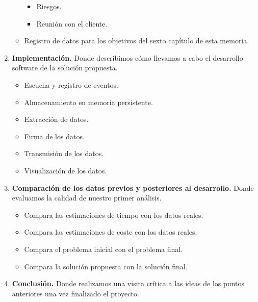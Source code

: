 \begin{enumerate}
\begin{itemize}
\begin{itemize}
            \item Riesgos.
            \item Reunión con el cliente.
        \end{itemize}
        \item Registro de datos para los objetivos del sexto capítulo de esta memoria.
    \end{itemize}
    \item \textbf{Implementación.} Donde describimos cómo llevamos a cabo el desarrollo software
    de la solución propuesta.
    \begin{itemize}
        \item Escucha y registro de eventos.
        \item Almacenamiento en memoria persistente.
        \item Extracción de datos.
        \item Firma de los datos.
        \item Transmisión de los datos.
        \item Visualización de los datos.
    \end{itemize}
    \item \textbf{Comparación de los datos previos y posteriores al desarrollo.} Donde evaluamos la
    calidad de nuestro primer análisis.
    \begin{itemize}
        \item Compara las estimaciones de tiempo con los datos reales.
        \item Compara las estimaciones de coste con los datos reales.
        \item Compara el problema inicial con el problema final.
        \item Compara la solución propuesta con la solución final.
    \end{itemize}
    \item \textbf{Conclusión.} Donde realizamos una visita crítica a las ideas de los puntos
    anteriores una vez finalizado el proyecto.
\end{enumerate}
